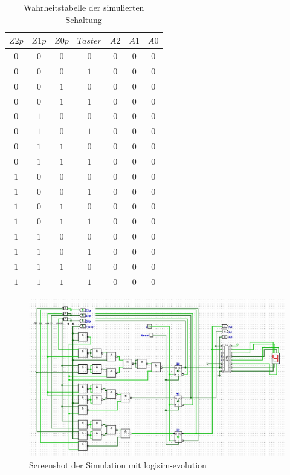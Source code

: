 \documentclass[
    paper=a4,
]{scrartcl}
\begin{document}
    \begin{table}
        \centering
        \caption{Wahrheitstabelle der simulierten Schaltung}
        \label{tab:3}
        \begin{tabular}{cccc|ccc}
            $Z2p$&$Z1p$&$Z0p$&$Taster$&$A2$&$A1$&$A0$\\
            \hline
            $0$&$0$&$0$&$0$&$0$&$0$&$0$\\
            $0$&$0$&$0$&$1$&$0$&$0$&$0$\\
            $0$&$0$&$1$&$0$&$0$&$0$&$0$\\
            $0$&$0$&$1$&$1$&$0$&$0$&$0$\\
            $0$&$1$&$0$&$0$&$0$&$0$&$0$\\
            $0$&$1$&$0$&$1$&$0$&$0$&$0$\\
            $0$&$1$&$1$&$0$&$0$&$0$&$0$\\
            $0$&$1$&$1$&$1$&$0$&$0$&$0$\\
            $1$&$0$&$0$&$0$&$0$&$0$&$0$\\
            $1$&$0$&$0$&$1$&$0$&$0$&$0$\\
            $1$&$0$&$1$&$0$&$0$&$0$&$0$\\
            $1$&$0$&$1$&$1$&$0$&$0$&$0$\\
            $1$&$1$&$0$&$0$&$0$&$0$&$0$\\
            $1$&$1$&$0$&$1$&$0$&$0$&$0$\\
            $1$&$1$&$1$&$0$&$0$&$0$&$0$\\
            $1$&$1$&$1$&$1$&$0$&$0$&$0$\\
            \end{tabular}
    \end{table}

    \begin{figure}
        \centering
        \includegraphics[width=\textwidth]{Screenshot.jpg}
        \caption{Screenshot der Simulation mit logisim-evolution}
        \label{fig:4}
    \end{figure}
\end{document}
